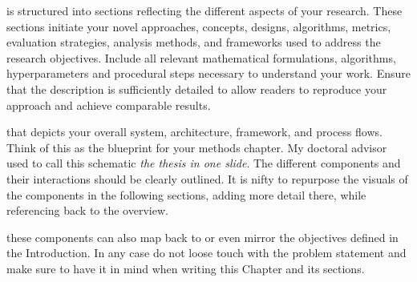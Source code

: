 

 is structured into sections reflecting the different aspects of your research.
These sections initiate your novel approaches, concepts, designs, algorithms, metrics, evaluation strategies, analysis methods, and frameworks 
used to address the research objectives.
Include all relevant mathematical formulations, algorithms, hyperparameters and procedural steps necessary to understand your work.
Ensure that the description is sufficiently detailed to allow readers to reproduce your approach and achieve comparable results.




 that depicts your overall system, architecture, framework, and process flows.
Think of this as the blueprint for your methods chapter. My doctoral advisor used to call this schematic \textit{the thesis in one slide}.
The different components and their interactions should be clearly outlined. 
It is nifty to repurpose the visuals of the components in the following sections, adding more detail there, while referencing back to the overview.



 these components can also map back to or even mirror the objectives defined in the Introduction.
In any case do not loose touch with the problem statement and make sure to have it in mind when writing this Chapter and its sections.



